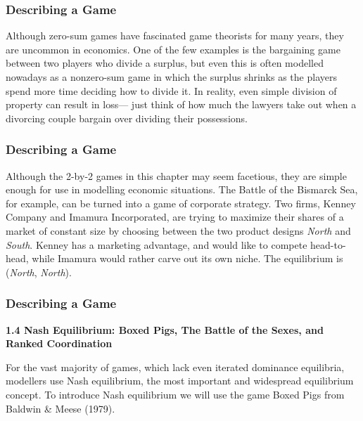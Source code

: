  \begin{frame}[fragile]\frametitle{Describing a Game}
  Although zero-sum games have fascinated game theorists for many years, they
are uncommon in economics. One of the few examples is the bargaining game
between two players who divide a surplus, but even this is often modelled
nowadays as a nonzero-sum game in which the surplus shrinks as the players spend
more time deciding how to divide it. In reality, even simple division of
property can result in loss--- just think of how much the lawyers take out
when a  divorcing couple bargain over dividing their possessions.

\end{frame}
 \begin{frame}[fragile]\frametitle{Describing a Game}

  Although the 2-by-2 games in this chapter may seem facetious, they are simple
enough for use in modelling economic situations.     The  Battle of the Bismarck
Sea, for example, can be turned into a game of corporate strategy. Two firms,
Kenney Company and Imamura Incorporated, are trying to maximize their shares of
a market of constant size by choosing between the two product designs {\it
North} and {\it South}. Kenney has a marketing advantage, and would like to
compete head-to-head, while Imamura would rather carve out its own niche. The
equilibrium is ({\it North}, {\it North}).

\end{frame}
 \begin{frame}[fragile]\frametitle{Describing a Game}


  {\bf 1.4 Nash Equilibrium:    Boxed Pigs,   The Battle  of the Sexes, and
Ranked Coordination    }

 
  For the vast majority of games, which lack even iterated dominance equilibria,
modellers use Nash equilibrium, the most important and widespread equilibrium
concept. To introduce Nash equilibrium we will use the game { Boxed Pigs} from
Baldwin \& Meese (1979).

\end{frame}
